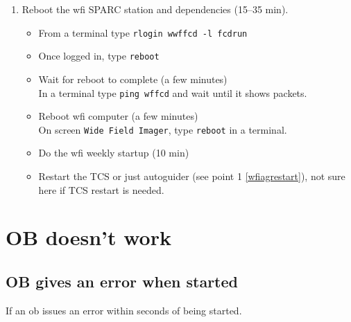 \documentclass[11pt,fleqn,a4paper]{book}
\makeatletter
\def\menu#1#2{\texttt{#1}\ifx{}#2\else\@for\@x:=#2\do{$\rightarrow$\texttt{\@x}}\fi}
\def\wmenu#1#2{window menu \menu{#1}{#2}}
\makeatother
\begin{document}
\begin{enumerate}
\begin{enumerate}
       \item Reactivate the connection between \gls{feros} and TCS
           \begin{itemize}
                \item On the \gls{feros} screen (), locate the \gls{feros} control panel ()
                \item Select \wmenu{Telescope}{ENABLE}
           \end{itemize}
    \end{enumerate}
    \item Reboot the \gls{wfi} SPARC station and dependencies (15--35 min).
    \begin{itemize}
        \item From a terminal type \texttt{rlogin \gls{wwffcd} -l fcdrun}
        \item Once logged in, type \texttt{reboot}
        \item Wait for reboot to complete (a few minutes)\\
              In a terminal type \texttt{ping wffcd} and wait until it shows packets.
        \item Reboot \gls{wfi} computer (a few minutes)\\
              On screen \texttt{Wide Field Imager}, type \texttt{reboot} in a terminal.
        \item Do the \gls{wfi} weekly startup (10 min)
        \item Restart the TCS or just autoguider (see point 1 \ref{wfiagrestart}), not sure here if TCS restart is needed.
    \end{itemize}
\end{enumerate}

\section{OB doesn't work}

\subsection{OB gives an error when started}

If an \gls{ob} issues an error within seconds of being started.
\end{document}
